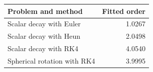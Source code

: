 \begin{tabular}{lr}
\hline
Problem and method & Fitted order\\
\hline
Scalar decay with Euler & 1.0267\\
Scalar decay with Heun & 2.0498\\
Scalar decay with RK4 & 4.0540\\
Spherical rotation with RK4 & 3.9995\\
\hline
\end{tabular}
